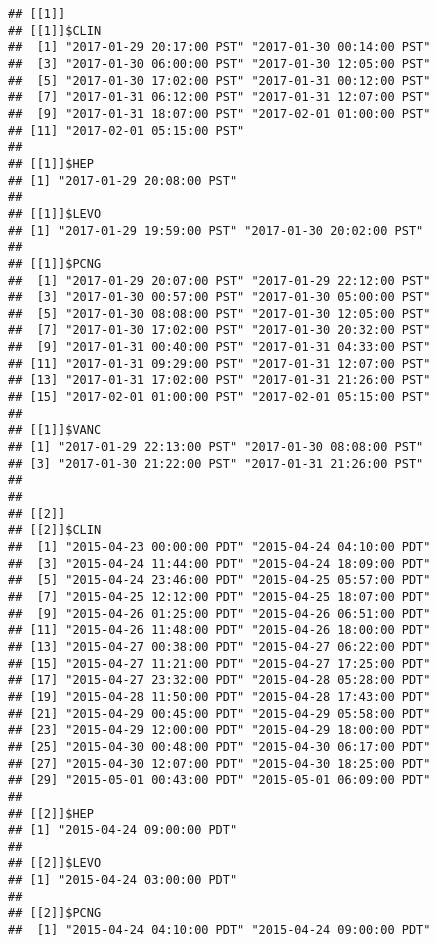 \documentclass[]{article}
\newenvironment{Shaded}{\begin{snugshade}}{\end{snugshade}}
\newcommand{\KeywordTok}[1]{\textcolor[rgb]{0.13,0.29,0.53}{\textbf{#1}}}
\newcommand{\NormalTok}[1]{#1}
\newcommand{\OperatorTok}[1]{\textcolor[rgb]{0.81,0.36,0.00}{\textbf{#1}}}
\begin{document}
\begin{Shaded}
\end{Shaded}

\begin{verbatim}
## [[1]]
## [[1]]$CLIN
##  [1] "2017-01-29 20:17:00 PST" "2017-01-30 00:14:00 PST"
##  [3] "2017-01-30 06:00:00 PST" "2017-01-30 12:05:00 PST"
##  [5] "2017-01-30 17:02:00 PST" "2017-01-31 00:12:00 PST"
##  [7] "2017-01-31 06:12:00 PST" "2017-01-31 12:07:00 PST"
##  [9] "2017-01-31 18:07:00 PST" "2017-02-01 01:00:00 PST"
## [11] "2017-02-01 05:15:00 PST"
## 
## [[1]]$HEP
## [1] "2017-01-29 20:08:00 PST"
## 
## [[1]]$LEVO
## [1] "2017-01-29 19:59:00 PST" "2017-01-30 20:02:00 PST"
## 
## [[1]]$PCNG
##  [1] "2017-01-29 20:07:00 PST" "2017-01-29 22:12:00 PST"
##  [3] "2017-01-30 00:57:00 PST" "2017-01-30 05:00:00 PST"
##  [5] "2017-01-30 08:08:00 PST" "2017-01-30 12:05:00 PST"
##  [7] "2017-01-30 17:02:00 PST" "2017-01-30 20:32:00 PST"
##  [9] "2017-01-31 00:40:00 PST" "2017-01-31 04:33:00 PST"
## [11] "2017-01-31 09:29:00 PST" "2017-01-31 12:07:00 PST"
## [13] "2017-01-31 17:02:00 PST" "2017-01-31 21:26:00 PST"
## [15] "2017-02-01 01:00:00 PST" "2017-02-01 05:15:00 PST"
## 
## [[1]]$VANC
## [1] "2017-01-29 22:13:00 PST" "2017-01-30 08:08:00 PST"
## [3] "2017-01-30 21:22:00 PST" "2017-01-31 21:26:00 PST"
## 
## 
## [[2]]
## [[2]]$CLIN
##  [1] "2015-04-23 00:00:00 PDT" "2015-04-24 04:10:00 PDT"
##  [3] "2015-04-24 11:44:00 PDT" "2015-04-24 18:09:00 PDT"
##  [5] "2015-04-24 23:46:00 PDT" "2015-04-25 05:57:00 PDT"
##  [7] "2015-04-25 12:12:00 PDT" "2015-04-25 18:07:00 PDT"
##  [9] "2015-04-26 01:25:00 PDT" "2015-04-26 06:51:00 PDT"
## [11] "2015-04-26 11:48:00 PDT" "2015-04-26 18:00:00 PDT"
## [13] "2015-04-27 00:38:00 PDT" "2015-04-27 06:22:00 PDT"
## [15] "2015-04-27 11:21:00 PDT" "2015-04-27 17:25:00 PDT"
## [17] "2015-04-27 23:32:00 PDT" "2015-04-28 05:28:00 PDT"
## [19] "2015-04-28 11:50:00 PDT" "2015-04-28 17:43:00 PDT"
## [21] "2015-04-29 00:45:00 PDT" "2015-04-29 05:58:00 PDT"
## [23] "2015-04-29 12:00:00 PDT" "2015-04-29 18:00:00 PDT"
## [25] "2015-04-30 00:48:00 PDT" "2015-04-30 06:17:00 PDT"
## [27] "2015-04-30 12:07:00 PDT" "2015-04-30 18:25:00 PDT"
## [29] "2015-05-01 00:43:00 PDT" "2015-05-01 06:09:00 PDT"
## 
## [[2]]$HEP
## [1] "2015-04-24 09:00:00 PDT"
## 
## [[2]]$LEVO
## [1] "2015-04-24 03:00:00 PDT"
## 
## [[2]]$PCNG
##  [1] "2015-04-24 04:10:00 PDT" "2015-04-24 09:00:00 PDT"

\end{verbatim}
\end{document}
